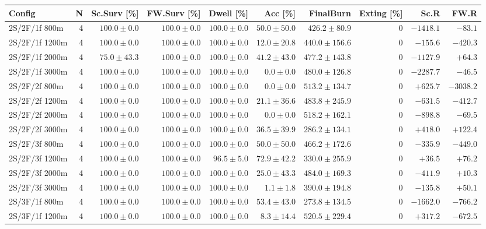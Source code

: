\begin{tabular}{l r r r r r r r r r}
\toprule
Config & N & Sc.Surv [\%] & FW.Surv [\%] & Dwell [\%] & Acc [\%] & FinalBurn & Exting [\%] & Sc.R & FW.R \\
\midrule
2S/2F/1f 800m & 4 & $100.0 \pm 0.0$ & $100.0 \pm 0.0$ & $100.0 \pm 0.0$ & $50.0 \pm 50.0$ & $426.2 \pm 80.9$ & $0$ & $-1418.1$ & $-83.1$ \\
2S/2F/1f 1200m & 4 & $100.0 \pm 0.0$ & $100.0 \pm 0.0$ & $100.0 \pm 0.0$ & $12.0 \pm 20.8$ & $440.0 \pm 156.6$ & $0$ & $-155.6$ & $-420.3$ \\
2S/2F/1f 2000m & 4 & $75.0 \pm 43.3$ & $100.0 \pm 0.0$ & $100.0 \pm 0.0$ & $41.2 \pm 43.0$ & $477.2 \pm 143.8$ & $0$ & $-1127.9$ & $+64.3$ \\
2S/2F/1f 3000m & 4 & $100.0 \pm 0.0$ & $100.0 \pm 0.0$ & $100.0 \pm 0.0$ & $0.0 \pm 0.0$ & $480.0 \pm 126.8$ & $0$ & $-2287.7$ & $-46.5$ \\
2S/2F/2f 800m & 4 & $100.0 \pm 0.0$ & $100.0 \pm 0.0$ & $100.0 \pm 0.0$ & $0.0 \pm 0.0$ & $513.2 \pm 134.7$ & $0$ & $+625.7$ & $-3038.2$ \\
2S/2F/2f 1200m & 4 & $100.0 \pm 0.0$ & $100.0 \pm 0.0$ & $100.0 \pm 0.0$ & $21.1 \pm 36.6$ & $483.8 \pm 245.9$ & $0$ & $-631.5$ & $-412.7$ \\
2S/2F/2f 2000m & 4 & $100.0 \pm 0.0$ & $100.0 \pm 0.0$ & $100.0 \pm 0.0$ & $0.0 \pm 0.0$ & $518.2 \pm 162.1$ & $0$ & $-898.8$ & $-69.5$ \\
2S/2F/2f 3000m & 4 & $100.0 \pm 0.0$ & $100.0 \pm 0.0$ & $100.0 \pm 0.0$ & $36.5 \pm 39.9$ & $286.2 \pm 134.1$ & $0$ & $+418.0$ & $+122.4$ \\
2S/2F/3f 800m & 4 & $100.0 \pm 0.0$ & $100.0 \pm 0.0$ & $100.0 \pm 0.0$ & $50.0 \pm 50.0$ & $466.2 \pm 172.6$ & $0$ & $-335.9$ & $-449.0$ \\
2S/2F/3f 1200m & 4 & $100.0 \pm 0.0$ & $100.0 \pm 0.0$ & $96.5 \pm 5.0$ & $72.9 \pm 42.2$ & $330.0 \pm 255.9$ & $0$ & $+36.5$ & $+76.2$ \\
2S/2F/3f 2000m & 4 & $100.0 \pm 0.0$ & $100.0 \pm 0.0$ & $100.0 \pm 0.0$ & $25.0 \pm 43.3$ & $484.0 \pm 169.3$ & $0$ & $-411.9$ & $+10.3$ \\
2S/2F/3f 3000m & 4 & $100.0 \pm 0.0$ & $100.0 \pm 0.0$ & $100.0 \pm 0.0$ & $1.1 \pm 1.8$ & $390.0 \pm 194.8$ & $0$ & $-135.8$ & $+50.1$ \\
2S/3F/1f 800m & 4 & $100.0 \pm 0.0$ & $100.0 \pm 0.0$ & $100.0 \pm 0.0$ & $53.4 \pm 43.0$ & $273.8 \pm 134.5$ & $0$ & $-1662.0$ & $-766.2$ \\
2S/3F/1f 1200m & 4 & $100.0 \pm 0.0$ & $100.0 \pm 0.0$ & $100.0 \pm 0.0$ & $8.3 \pm 14.4$ & $520.5 \pm 229.4$ & $0$ & $+317.2$ & $-672.5$ \\

\end{tabular}
